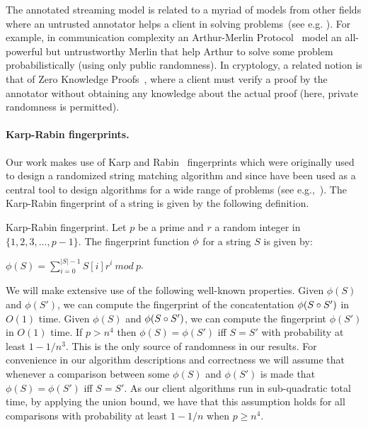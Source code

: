 The annotated streaming model is related to a myriad of models from other fields where an untrusted annotator helps a client in solving problems~(see e.g. \cite{goos2015zero, babai1985trading, goldwasser1986private, goldwasser1985knowledge, goldreich1991proofs}). For example, in communication complexity an Arthur-Merlin Protocol~\cite{babai1985trading, goldwasser1986private} model an all-powerful but untrustworthy Merlin that help Arthur to solve some problem probabilistically (using only public randomness).
In cryptology, a related notion is that of Zero Knowledge Proofs~\cite{goldwasser1985knowledge, goldreich1991proofs}, where a client must verify a proof by the annotator without obtaining any knowledge about the actual proof (here, private randomness is permitted). 


\paragraph{Karp-Rabin fingerprints.} Our work makes use of Karp and Rabin~\cite{karp1987efficient} fingerprints which were originally used to design a randomized string matching algorithm and since have been used as a central tool to design algorithms for a wide range of problems (see e.g.,~\cite{cole2003faster, kalai2002efficient, porat2009exact}). The Karp-Rabin fingerprint of a string is given by the following definition.

\begin{definition}{Karp-Rabin fingerprint.}
Let $p$ be a prime and $r$ a random integer in $\{1,2,3, \ldots, p-1\}$. The fingerprint function $\phi$ for a string $S$ is given by:
\begin{center}
 $\phi(S)=\sum_{i=0}^{|S|-1} S[i]r^i ~mod~ p$.
\end{center}
\end{definition}

We will make extensive use of the following well-known properties. Given $\phi(S)$ and $\phi(S')$, we can compute the fingerprint of the concatentation $\phi(S \circ S')$ in $O(1)$ time. Given $\phi(S)$ and $\phi(S \circ S')$, we can compute the fingerprint $\phi(S')$ in $O(1)$ time. If $p>n^4$ then $\phi(S)=\phi(S')$ iff $S=S'$ with probability at least $1-1/n^3$. This is the only source of randomness in our results. For convenience in our algorithm descriptions and correctness we will assume that whenever a comparison between some $\phi(S)$ and  $\phi(S')$ is made that  $\phi(S)=\phi(S')$ iff  $S=S'$. As our client algorithms run in sub-quadratic total time, by applying the union bound, we have that this assumption holds for all comparisons with probability at least $1-1/n$ when $p \geq n^4$.




